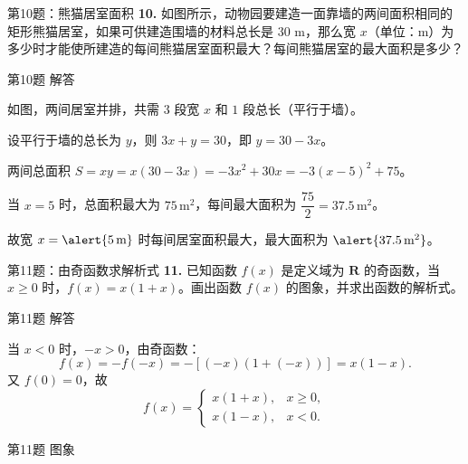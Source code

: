 \documentclass[10pt,aspectratio=169,serif,fleqn]{beamer}
\begin{document}
\begin{frame}[t]{第10题：熊猫居室面积}
\textbf{10.} 如图所示，动物园要建造一面靠墙的两间面积相同的矩形熊猫居室，如果可供建造围墙的材料总长是 $30$ m，那么宽 $x$（单位：m）为多少时才能使所建造的每间熊猫居室面积最大？每间熊猫居室的最大面积是多少？
\end{frame}

\begin{frame}[t]{第10题 解答}
\begin{tcolorbox}[colback=orange!10,colframe=orange,title=\textbf{解}]
如图，两间居室并排，共需 $3$ 段宽 $x$ 和 $1$ 段总长（平行于墙）。

\vspace{0.3em}
设平行于墙的总长为 $y$，则 $3x+y=30$，即 $y=30-3x$。

\vspace{0.3em}
两间总面积 $S=xy=x(30-3x)=-3x^2+30x=-3(x-5)^2+75$。

\vspace{0.5em}
当 $x=5$ 时，总面积最大为 $75\,\text{m}^2$，每间最大面积为 $\dfrac{75}{2}=37.5\,\text{m}^2$。

\vspace{0.5em}
故宽 $x=\alert{5\,\text{m}}$ 时每间居室面积最大，最大面积为 $\alert{37.5\,\text{m}^2}$。
\end{tcolorbox}
\end{frame}

\begin{frame}[t]{第11题：由奇函数求解析式}
\textbf{11.} 已知函数 $f(x)$ 是定义域为 $\mathbf{R}$ 的奇函数，当 $x\ge 0$ 时，$f(x)=x(1+x)$。画出函数 $f(x)$ 的图象，并求出函数的解析式。
\end{frame}

\begin{frame}[t]{第11题 解答}
\begin{tcolorbox}[colback=orange!10,colframe=orange,title=\textbf{解}]
当 $x<0$ 时，$-x>0$，由奇函数：
\[
f(x)=-f(-x)=-[(-x)(1+(-x))]=x(1-x).
\]
又 $f(0)=0$，故
\[
f(x)=
\begin{cases}
x(1+x), & x\ge 0,\\
x(1-x), & x<0.
\end{cases}
\]
\end{tcolorbox}
\end{frame}

\begin{frame}[t]{第11题 图象}
\begin{center}
\end{center}
\end{frame}
\end{document}
